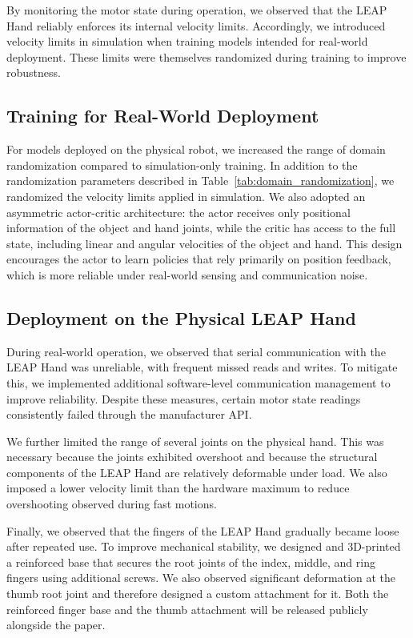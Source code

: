 By monitoring the motor state during operation, we observed that the LEAP Hand reliably enforces its internal velocity limits. Accordingly, we introduced velocity limits in simulation when training models intended for real-world deployment. These limits were themselves randomized during training to improve robustness.

\subsection{Training for Real-World Deployment}

For models deployed on the physical robot, we increased the range of domain randomization compared to simulation-only training. In addition to the randomization parameters described in Table~\ref{tab:domain_randomization}, we randomized the velocity limits applied in simulation. We also adopted an asymmetric actor-critic architecture: the actor receives only positional information of the object and hand joints, while the critic has access to the full state, including linear and angular velocities of the object and hand. This design encourages the actor to learn policies that rely primarily on position feedback, which is more reliable under real-world sensing and communication noise.

\subsection{Deployment on the Physical LEAP Hand}

During real-world operation, we observed that serial communication with the LEAP Hand was unreliable, with frequent missed reads and writes. To mitigate this, we implemented additional software-level communication management to improve reliability. Despite these measures, certain motor state readings consistently failed through the manufacturer API.

We further limited the range of several joints on the physical hand. This was necessary because the joints exhibited overshoot and because the structural components of the LEAP Hand are relatively deformable under load. We also imposed a lower velocity limit than the hardware maximum to reduce overshooting observed during fast motions.

Finally, we observed that the fingers of the LEAP Hand gradually became loose after repeated use. To improve mechanical stability, we designed and 3D-printed a reinforced base that secures the root joints of the index, middle, and ring fingers using additional screws. We also observed significant deformation at the thumb root joint and therefore designed a custom attachment for it. Both the reinforced finger base and the thumb attachment will be released publicly alongside the paper.


